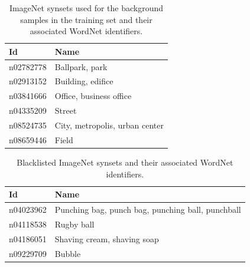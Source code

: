 \documentclass{sig-alternate-05-2015}
\begin{document}
{{      \begin{table}[t]
        \centering
        \caption{ImageNet synsets used for the background samples in the training set and their associated WordNet identifiers.}
				\label{tab:background_samples}
        \begin{tabularx}{1.0\columnwidth}{@{}lX@{}}
          \toprule
          \textbf{Id} & \textbf{Name} \\
          \midrule
            n02782778 & Ballpark, park \\
            n02913152 & Building, edifice \\
            n03841666 & Office, business office \\
            n04335209 & Street \\
            n08524735 & City, metropolis, urban center \\
            n08659446 & Field \\
          \bottomrule
        \end{tabularx}
      \end{table}

      \begin{table}[h]
        \centering
        \caption{Blacklisted ImageNet synsets and their associated WordNet identifiers.}
        \label{tab:blacklisted_synsets}
        \begin{tabularx}{1.0\columnwidth}{@{}lX@{}}
          \toprule
          \textbf{Id} & \textbf{Name} \\
          \midrule
              n04023962 & Punching bag, punch bag, punching ball, punchball \\
              n04118538 & Rugby ball \\
              n04186051 & Shaving cream, shaving soap \\
              n09229709 & Bubble \\
          \bottomrule
        \end{tabularx}
      \end{table}
		}
	}


\end{document}
